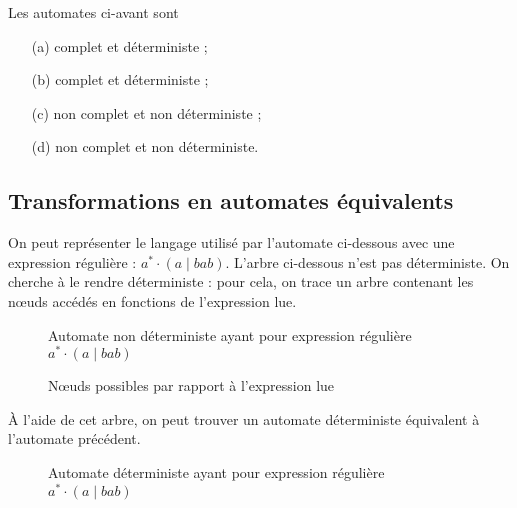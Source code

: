 \begin{exm}
	Les automates ci-avant sont
	\begin{enumerate}
		\item[(a)] complet et déterministe ;
		\item[(b)] complet et déterministe ;
		\item[(c)] non complet et non déterministe ;
		\item[(d)] non complet et non déterministe.
	\end{enumerate}
\end{exm}

\subsection{Transformations en automates équivalents}

On peut représenter le langage utilisé par l'automate ci-dessous avec une expression régulière : $a^* \cdot (a  \mid bab)$. L'arbre ci-dessous n'est pas déterministe. On cherche à le rendre déterministe : pour cela, on trace un arbre contenant les nœuds accédés en fonctions de l'expression lue.
\begin{figure}[H]
	\centering
	\caption{Automate non déterministe ayant pour expression régulière $a^* \cdot (a  \mid bab)$}
\end{figure}

\begin{figure}[H]
	\centering
	{\small{}}
	\caption{Nœuds possibles par rapport à l'expression lue}
\end{figure}

À l'aide de cet arbre, on peut trouver un automate déterministe équivalent à l'automate précédent.

\begin{figure}[H]
	\centering
	{}
	\caption{Automate déterministe ayant pour expression régulière $a^* \cdot (a  \mid  bab)$}
\end{figure}

